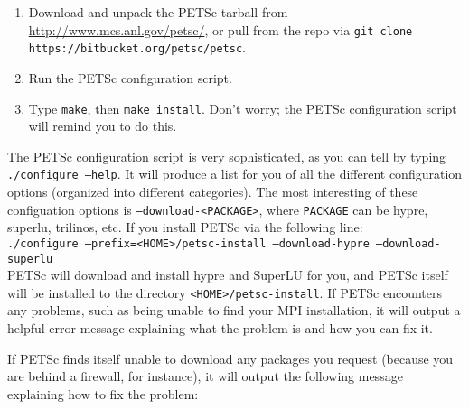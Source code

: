 \documentclass[pdf,12pt,report,strict]{SANDreport}
\begin{document}
\begin{enumerate}
  \item Download and unpack the PETSc tarball from
  \url{http://www.mcs.anl.gov/petsc/}, or pull from the repo via {\tt git clone
  https://bitbucket.org/petsc/petsc}.
  \item Run the PETSc configuration script.
  \item Type {\tt make}, then {\tt make install}.  Don't worry; the PETSc
  configuration script will remind you to do this.
\end{enumerate}

The PETSc configuration script is very sophisticated, as you can tell by typing
{\tt ./configure --help}.  It will produce a list for you of all the different
configuration options (organized into different categories).  The most
interesting of these configuation options is {\tt --download-<PACKAGE>}, where
{\tt PACKAGE} can be hypre, superlu, trilinos, etc.  If you install PETSc via
the following line:
\\
{\tt ./configure --prefix=<HOME>/petsc-install --download-hypre
--download-superlu}
\\
PETSc will download and install hypre and SuperLU for you, and PETSc itself will
be installed to the directory {\tt <HOME>/petsc-install}.  If PETSc encounters
any problems, such as being unable to find your MPI installation, it will output
a helpful error message explaining what the problem is and how you can fix it.

If PETSc finds itself unable to download any packages you request (because you
are behind a firewall, for instance), it will output the following message
explaining how to fix the problem:
\end{document}
